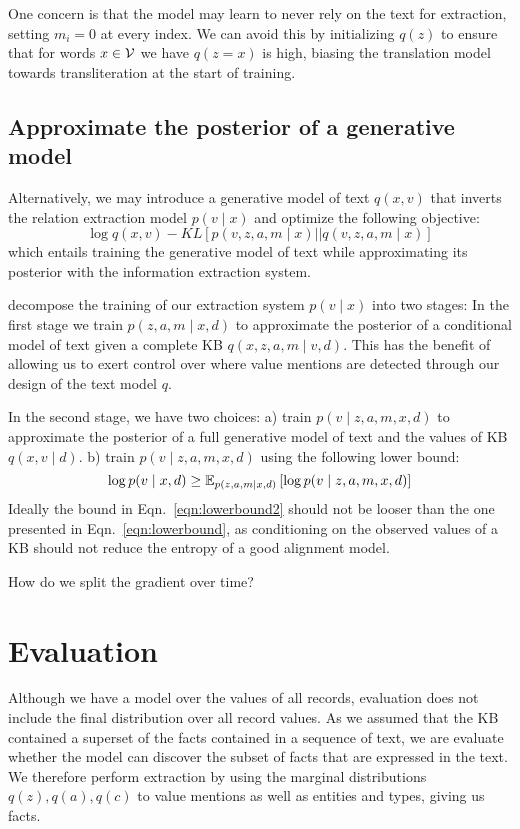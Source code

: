 \documentclass[12pt]{article}
\begin{document}
One concern is that the model may learn to never rely on the text for extraction,
setting $m_i = 0$ at every index.
We can avoid this by initializing $q(z)$ to ensure that for words $x \in \mathcal{V}$ 
we have $q(z = x)$ is high, biasing the translation model towards transliteration
at the start of training.

\subsection{Approximate the posterior of a generative model}
Alternatively, we may introduce a generative model of text $q(x, v)$ 
that inverts the relation extraction model $p(v \mid x)$ and optimize the following objective:
\begin{equation}
\log q(x,v) - KL[p(v,z,a,m \mid x) || q(v,z,a,m \mid x)]
\end{equation}
which entails training the generative model of text while approximating its
posterior with the information extraction system.

decompose the training of our extraction system $p(v\mid x)$ into two stages:
In the first stage we train $p(z,a,m\mid x,d)$ to approximate the posterior
of a conditional model of text given a complete KB $q(x,z,a,m \mid v,d)$.
This has the benefit of allowing us to exert control over where value mentions are detected
through our design of the text model $q$.

In the second stage, we have two choices:
a) train $p(v \mid z,a,m,x,d)$ to approximate the posterior of a full generative model of text and
the values of KB $q(x,v\mid d)$.
b) train $p(v \mid z,a,m,x,d)$ using the following lower bound:
\begin{equation}
\label{eqn:lowerbound2}
\log p(v\mid x,d) \geq
\mathbb{E}_{p(z,a,m\mid x,d)}\left[\log p(v\mid z,a,m, x,d)\right]
\end{equation}
Ideally the bound in Eqn.~\ref{eqn:lowerbound2}
should not be looser than the one presented in Eqn.~\ref{eqn:lowerbound},
as conditioning on the observed values of a KB should not reduce the entropy of
a good alignment model.

How do we split the gradient over time?

\section{Evaluation}
Although we have a model over the values of all records,
evaluation does not include the final distribution over all record values.
As we assumed that the KB contained a superset of the facts contained in
a sequence of text, we are evaluate whether the model can discover the subset of facts that 
are expressed in the text.
We therefore perform extraction by using the marginal distributions
$q(z),q(a),q(c)$ to value mentions as well as entities and types,
giving us facts.



\end{document}
